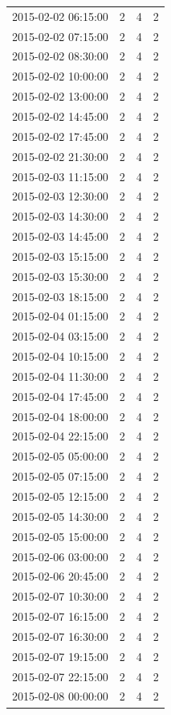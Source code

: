 \begin{tabular}{lrrr}
2015-02-02 06:15:00 & 2 & 4 & 2 \\
2015-02-02 07:15:00 & 2 & 4 & 2 \\
2015-02-02 08:30:00 & 2 & 4 & 2 \\
2015-02-02 10:00:00 & 2 & 4 & 2 \\
2015-02-02 13:00:00 & 2 & 4 & 2 \\
2015-02-02 14:45:00 & 2 & 4 & 2 \\
2015-02-02 17:45:00 & 2 & 4 & 2 \\
2015-02-02 21:30:00 & 2 & 4 & 2 \\
2015-02-03 11:15:00 & 2 & 4 & 2 \\
2015-02-03 12:30:00 & 2 & 4 & 2 \\
2015-02-03 14:30:00 & 2 & 4 & 2 \\
2015-02-03 14:45:00 & 2 & 4 & 2 \\
2015-02-03 15:15:00 & 2 & 4 & 2 \\
2015-02-03 15:30:00 & 2 & 4 & 2 \\
2015-02-03 18:15:00 & 2 & 4 & 2 \\
2015-02-04 01:15:00 & 2 & 4 & 2 \\
2015-02-04 03:15:00 & 2 & 4 & 2 \\
2015-02-04 10:15:00 & 2 & 4 & 2 \\
2015-02-04 11:30:00 & 2 & 4 & 2 \\
2015-02-04 17:45:00 & 2 & 4 & 2 \\
2015-02-04 18:00:00 & 2 & 4 & 2 \\
2015-02-04 22:15:00 & 2 & 4 & 2 \\
2015-02-05 05:00:00 & 2 & 4 & 2 \\
2015-02-05 07:15:00 & 2 & 4 & 2 \\
2015-02-05 12:15:00 & 2 & 4 & 2 \\
2015-02-05 14:30:00 & 2 & 4 & 2 \\
2015-02-05 15:00:00 & 2 & 4 & 2 \\
2015-02-06 03:00:00 & 2 & 4 & 2 \\
2015-02-06 20:45:00 & 2 & 4 & 2 \\
2015-02-07 10:30:00 & 2 & 4 & 2 \\
2015-02-07 16:15:00 & 2 & 4 & 2 \\
2015-02-07 16:30:00 & 2 & 4 & 2 \\
2015-02-07 19:15:00 & 2 & 4 & 2 \\
2015-02-07 22:15:00 & 2 & 4 & 2 \\
2015-02-08 00:00:00 & 2 & 4 & 2 \\

\end{tabular}
